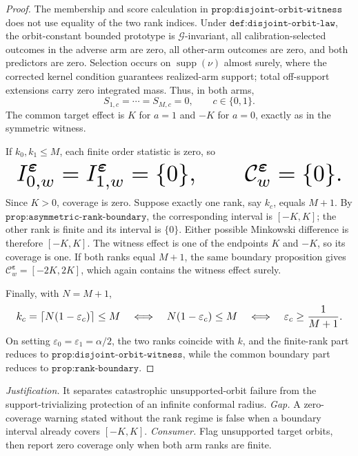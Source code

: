 \documentclass{article}
\begin{document}
\begin{proof}
The membership and score calculation in \(\texttt{prop:disjoint-orbit-witness}\) does not use equality of the two rank indices. Under \(\texttt{def:disjoint-orbit-law}\), the orbit-constant bounded prototype is \(\mathcal G\)-invariant, all calibration-selected outcomes in the adverse arm are zero, all other-arm outcomes are zero, and both predictors are zero. Selection occurs on \(\operatorname{supp}(\nu)\) almost surely, where the corrected kernel condition guarantees realized-arm support; total off-support extensions carry zero integrated mass. Thus, in both arms,
\[
S_{1,c}=\cdots=S_{M,c}=0,\qquad c\in\{0,1\}.
\]
The common target effect is \(K\) for \(a=1\) and \(-K\) for \(a=0\), exactly as in the symmetric witness.

If \(k_0,k_1\le M\), each finite order statistic is zero, so
\[
\makebox[\linewidth][c]{\resizebox{0.98\linewidth}{!}{\(\displaystyle I^{\boldsymbol\varepsilon}_{0,w}=I^{\boldsymbol\varepsilon}_{1,w}=\{0\},\qquad
\mathcal C^{\boldsymbol\varepsilon}_w=\{0\}.\)}}
\]
Since \(K>0\), coverage is zero. Suppose exactly one rank, say \(k_c\), equals \(M+1\). By \(\texttt{prop:asymmetric-rank-boundary}\), the corresponding interval is \([-K,K]\); the other rank is finite and its interval is \(\{0\}\). Either possible Minkowski difference is therefore \([-K,K]\). The witness effect is one of the endpoints \(K\) and \(-K\), so its coverage is one. If both ranks equal \(M+1\), the same boundary proposition gives \(\mathcal C^{\boldsymbol\varepsilon}_w=[-2K,2K]\), which again contains the witness effect surely.

Finally, with \(N=M+1\),
\[
\makebox[\linewidth][c]{\resizebox{0.98\linewidth}{!}{\(\displaystyle k_c=\lceil N(1-\varepsilon_c)\rceil\le M
\quad\Longleftrightarrow\quad
N(1-\varepsilon_c)\le M
\quad\Longleftrightarrow\quad
\varepsilon_c\ge\frac1{M+1}.\)}}
\]
On setting \(\varepsilon_0=\varepsilon_1=\alpha/2\), the two ranks coincide with \(k\), and the finite-rank part reduces to \(\texttt{prop:disjoint-orbit-witness}\), while the common boundary part reduces to \(\texttt{prop:rank-boundary}\).
\end{proof}
\par\smallskip\noindent \textit{Justification.} It separates catastrophic unsupported-orbit failure from the support-trivializing protection of an infinite conformal radius. \textit{Gap.} A zero-coverage warning stated without the rank regime is false when a boundary interval already covers \([-K,K]\). \textit{Consumer.} Flag unsupported target orbits, then report zero coverage only when both arm ranks are finite.
\end{document}
